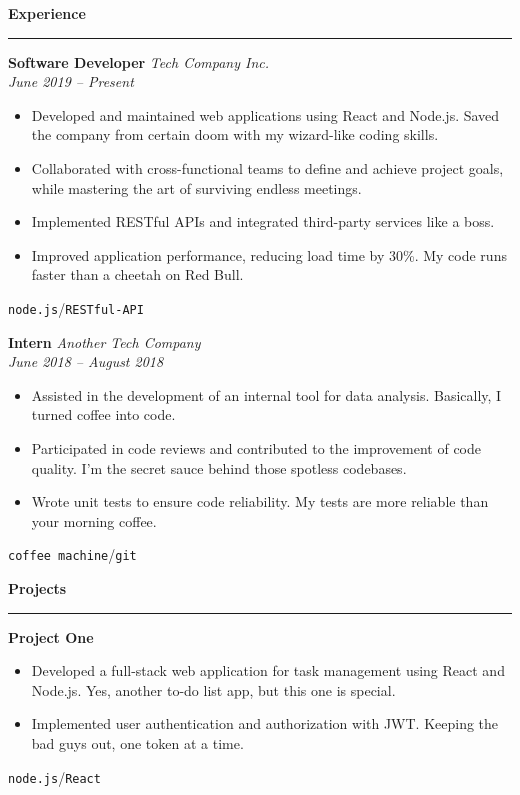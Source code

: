\documentclass[a4paper,11pt]{article}
\newcommand{\sectiontitle}[1]{\textbf{\Large #1}\par\vspace{-1em}\noindent\rule{\linewidth}{0.3mm}\par\vspace{0.3em}}
\newcommand{\slashsep}{\hspace{3mm}/\hspace{3mm}}
\begin{document}
\begin{multicols}{2}
	\vspace{1em}

	\sectiontitle{Experience}

	\textbf{\large Software Developer} \hfill \textit{Tech Company Inc.}\\
	\textit{June 2019 -- Present}
	\begin{itemize}
		\item Developed and maintained web applications using React and Node.js. Saved the company from certain doom with my wizard-like coding skills.
		\item Collaborated with cross-functional teams to define and achieve project goals, while mastering the art of surviving endless meetings.
		\item Implemented RESTful APIs and integrated third-party services like a boss.
		\item Improved application performance, reducing load time by 30\%. My code runs faster than a cheetah on Red Bull.
	\end{itemize}
    \texttt{node.js}\slashsep\texttt{RESTful-API}
    \vspace{0.5em}

	\textbf{\large Intern} \hfill \textit{Another Tech Company}\\
	\textit{June 2018 -- August 2018}
	\begin{itemize}
		\item Assisted in the development of an internal tool for data analysis. Basically, I turned coffee into code.
		\item Participated in code reviews and contributed to the improvement of code quality. I'm the secret sauce behind those spotless codebases.
		\item Wrote unit tests to ensure code reliability. My tests are more reliable than your morning coffee.
	\end{itemize}
    \texttt{coffee machine}\slashsep\texttt{git}

	\vspace{1em}

	\sectiontitle{Projects}

	\textbf{\large Project One}
	\begin{itemize}
		\item Developed a full-stack web application for task management using React and Node.js. Yes, another to-do list app, but this one is special.
		\item Implemented user authentication and authorization with JWT. Keeping the bad guys out, one token at a time.
	\end{itemize}
    \texttt{node.js}\slashsep\texttt{React}
	\vspace{0.5em}


\end{multicols}
\end{document}
